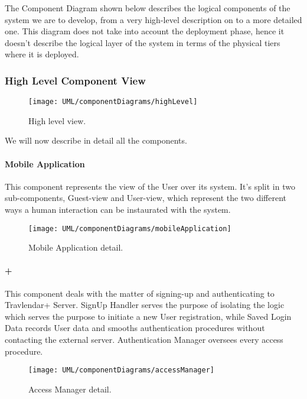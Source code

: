 The Component Diagram shown below describes the logical components of the system we are to develop, from a very high-level description on to a more detailed one. This diagram does not take into account the deployment phase, hence it doesn’t describe the logical layer of the system in terms of the physical tiers where it is deployed.

\subsubsection{High Level Component View}

	\begin{figure}[H]
			\centering
			\texttt{[image: UML/componentDiagrams/highLevel]}
			\caption{High level view.}
			\label{componentHighLevel}
		\end{figure}

	We will now describe in detail all the components.

	\paragraph{Mobile Application}
		This component represents the view of the User over its system. It’s split in two sub-components, Guest-view and User-view, which represent the two different ways a human interaction can be instaurated with the system.

		\begin{figure}[H]
			\centering
			\texttt{[image: UML/componentDiagrams/mobileApplication]}
			\caption{Mobile Application detail.}
			\label{mobileApplicationDetail}
		\end{figure}

	\paragraph{+}
	This component deals with the matter of signing-up and authenticating to Travlendar+ Server. SignUp Handler serves the purpose of isolating the logic which serves the purpose to initiate a new User registration, while Saved Login Data records User data and smooths authentication procedures without contacting the external server. Authentication Manager oversees every access procedure.
		\begin{figure}[H]
			\centering
			\texttt{[image: UML/componentDiagrams/accessManager]}
			\caption{Access Manager detail.}
			\label{accessManagerDetail}
		\end{figure}
		
